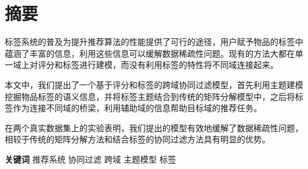 \chapter{摘要}

标签系统的普及为提升推荐算法的性能提供了可行的途径，用户赋予物品的标签中蕴涵了丰富的信息，利用这些信息可以缓解数据稀疏性问题。现有的方法大都在单一域上对评分和标签进行建模，而没有利用标签的特性将不同域连接起来。

本文中，我们提出了一个基于评分和标签的跨域协同过滤模型，首先利用主题建模挖掘物品标签的语义信息，并将标签主题结合到传统的矩阵分解模型中，之后将标签作为连接不同域的桥梁，利用辅助域的信息帮助目标域的推荐任务。

在两个真实数据集上的实验表明，我们提出的模型有效地缓解了数据稀疏性问题，相较于传统的矩阵分解方法和结合标签的协同过滤方法具有明显的优势。

{
    \vspace{1em}
    \setlength{\parindent}{0em}
    \textbf{关键词} \; 推荐系统 \; 协同过滤 \; 跨域\; 主题模型 \; 标签 \par
}
